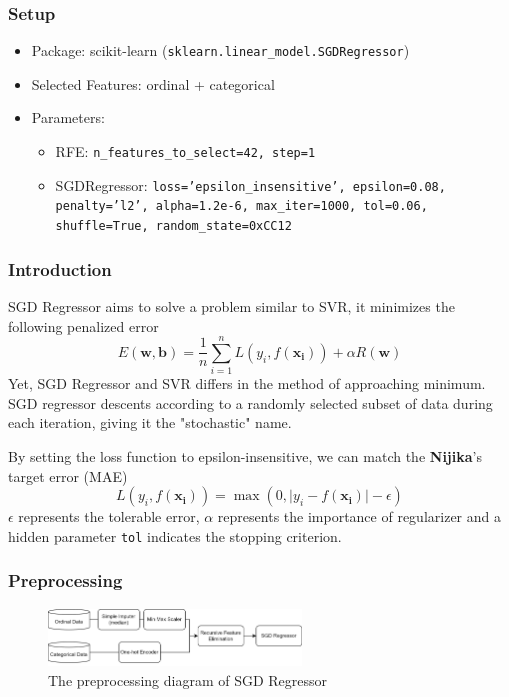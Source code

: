 \documentclass[10pt,letterpaper]{article}
\begin{document}
\subsubsection{Setup}
\begin{itemize}
	\item Package: scikit-learn (\verb|sklearn.linear_model.SGDRegressor|)
	\item Selected Features: ordinal + categorical
	\item Parameters:\begin{itemize}
		\item RFE: \verb|n_features_to_select=42, step=1|
		\item SGDRegressor: \texttt{loss='epsilon\_insensitive', epsilon=0.08, penalty='l2', alpha=1.2e-6, max\_iter=1000, tol=0.06, shuffle=True, random\_state=0xCC12}
	\end{itemize}
\end{itemize}

\subsubsection{Introduction}

SGD Regressor aims to solve a problem similar to SVR, it minimizes the following penalized error
$$
	E(\mathbf{w}, \mathbf{b}) = \frac{1}{n}\sum_{i=1}^n L(y_i, f(\mathbf{x_i})) + \alpha R(\mathbf{w})
$$
Yet, SGD Regressor and SVR differs in the method of approaching minimum. SGD regressor descents according to a randomly selected subset of data during each iteration, giving it the "stochastic" name. 

By setting the loss function to epsilon-insensitive, we can match the \textbf{Nijika}'s target error (MAE)
$$
	L(y_i, f(\mathbf{x_i})) = \max(0, \lvert y_i - f(\mathbf{x_i})\rvert - \epsilon)
$$
$\epsilon$ represents the tolerable error, $\alpha$ represents the importance of regularizer and a hidden parameter \texttt{tol} indicates the stopping criterion. 

\subsubsection{Preprocessing}

\begin{figure}[h]
	\centering
	\includegraphics[width=0.6\textwidth]{SGDregressor-diagram.png}
	\caption{The preprocessing diagram of SGD Regressor}
	\label{fig:SGDRegressorDiagram}
\end{figure}
\end{document}
